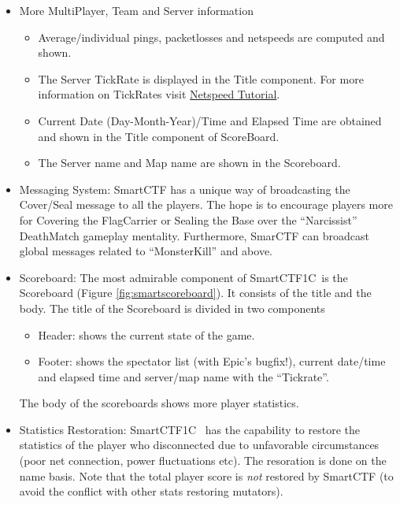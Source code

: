 \documentclass{article}
\newcommand{\SmartVersion}{1C}
\begin{document}
\begin{itemize}
\item More MultiPlayer, Team and Server information
  \begin{itemize}
  \item Average/individual pings, packetlosses and netspeeds are computed and shown.
  \item The Server TickRate is displayed in the Title component.  For more information on TickRates visit \href{http://wiki.unrealadmin.org/Netspeed_Tutorial_(UT)}{\color{Blue}Netspeed Tutorial}.
  \item Current Date (Day-Month-Year)/Time and Elapsed Time are obtained and shown in the Title component of ScoreBoard.
  \item The Server name and Map name are shown in the Scoreboard.
  \end{itemize}
\item Messaging System: SmartCTF has a unique way of broadcasting the Cover/Seal message to all the players.  The hope is to encourage players more for Covering the FlagCarrier or Sealing the Base over the ``Narcissist'' DeathMatch gameplay mentality.  Furthermore, SmarCTF can broadcast global messages related to ``MonsterKill'' and above.
  \item Scoreboard: The most admirable component of SmartCTF\SmartVersion~is the Scoreboard (Figure \ref{fig:smartscoreboard}).  It consists of the title and the body.  The title of the Scoreboard is divided in two components
    \begin{itemize}
    \item Header: shows the current state of the game.
    \item Footer: shows the spectator list (with Epic's bugfix!), current date/time and elapsed time
    and server/map name with the ``Tickrate''.
    \end{itemize}
The body of the scoreboards shows more player statistics.
\item Statistics Restoration: SmartCTF\SmartVersion~ has the capability to restore the statistics of the player who disconnected due to unfavorable circumstances (poor net connection, power fluctuations etc).  The resoration is done on the name basis.  Note that the total player score is \emph{not} restored by SmartCTF (to avoid the conflict with other stats restoring mutators).

\end{itemize}
\end{document}
